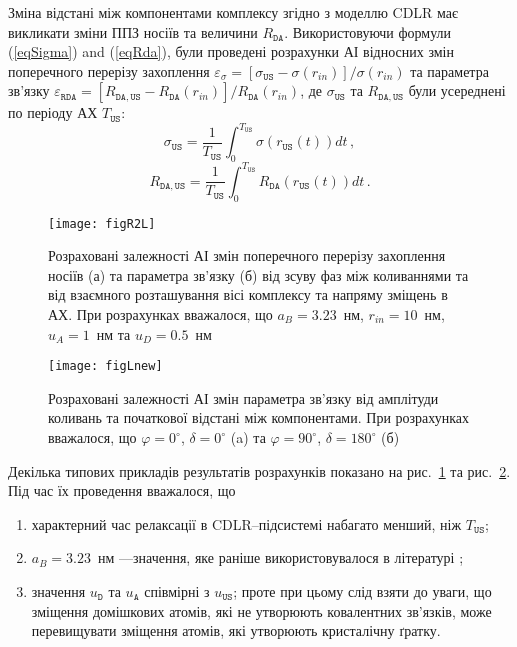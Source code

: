 Зміна відстані між компонентами комплексу згідно з моделлю CDLR має викликати зміни
ППЗ носіїв та величини $R_\mathtt{DA}$.
Використовуючи формули (\ref{eqSigma}) and (\ref{eqRda}), були проведені розрахунки
АІ відносних змін поперечного перерізу захоплення
$\varepsilon_\sigma=[\sigma_{\mathtt{US}}-\sigma(r_{in})]/\sigma(r_{in})$
та параметра зв'язку
$\varepsilon_{\mathtt{RDA}}=[R_{\mathtt{DA,US}}-R_\mathtt{DA}(r_{in})]/R_\mathtt{DA}(r_{in})$,
де $\sigma_{\mathtt{US}}$ та $R_{\mathtt{DA,US}}$ були усереднені по періоду АХ $T_\mathtt{US}$:
\begin{equation}
\label{eqAverSigma}
\sigma_{\mathtt{US}}=\frac{1}{T_\mathtt{US}}\int^{T_\mathtt{US}}_0\!\!\!\!\!\!\sigma(r_\mathtt{US}(t))dt\,,
\end{equation}
\begin{equation}
\label{eqAverRda}
R_{\mathtt{DA,US}}=\frac{1}{T_\mathtt{US}}\int^{T_\mathtt{US}}_0\!\!\!\!\!\!R_{\mathtt{DA}}(r_\mathtt{US}(t))dt\,.
\end{equation}


\begin{figure}
\center
\texttt{[image: figR2L]}
\caption{\label{figR2L}
Розраховані залежності  АІ змін поперечного перерізу захоплення носіїв (а) та параметра зв'язку (б) від зсуву фаз між коливаннями та від взаємного
розташування вісі комплексу та напряму зміщень в АХ.
При розрахунках вважалося, що $a_B=3.23$~нм, $r_{in}=10$~нм, $u_A=1$~нм та $u_D=0.5$~нм
}%
\end{figure}

\begin{figure}
\center
\texttt{[image: figLnew]}
\caption{\label{figLnew}
Розраховані залежності  АІ змін параметра зв'язку від амплітуди коливань та початкової відстані між компонентами.
При розрахунках вважалося, що $\varphi=0^\circ$, $\delta=0^\circ$ (a) та $\varphi=90^\circ$, $\delta=180^\circ$ (б)
}%
\end{figure}

Декілька типових прикладів результатів розрахунків показано на рис.~\ref{figR2L} та рис.~\ref{figLnew}.
Під час їх проведення вважалося, що
\begin{enumerate}[label=\asbuk*),leftmargin=0em,itemindent=1.5em]
\item характерний час релаксації в CDLR--підсистемі набагато менший, ніж $T_\mathtt{US}$;
\item $a_B=3.23$~нм ---значення, яке раніше використовувалося в літературі \cite{CDLR:JAP};
\item значення $u_\mathtt{D}$ та $u_\mathtt{A}$ співмірні з $u_\mathtt{US}$;
   проте при цьому слід взяти до уваги, що зміщення домішкових атомів, які не утворюють ковалентних зв'язків, може перевищувати
   зміщення атомів, які утворюють кристалічну ґратку.
\end{enumerate}

